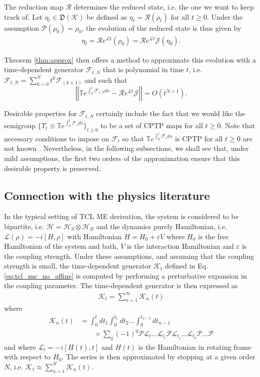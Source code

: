 \documentclass[twocolumn]{autart}    %
\newcommand{\Fc}{\mathcal{F}}
\newcommand{\Hc}{\mathcal{H}}
\newcommand{\Jc}{\mathcal{J}}
\newcommand{\Kc}{\mathcal{K}}
\newcommand{\Lc}{\mathcal{L}}
\newcommand{\Pc}{\mathcal{P}}
\newcommand{\Rc}{\mathcal{R}}
\newcommand{\Tb}{\mathbb{T}}
\newcommand{\Df}{\mathfrak{D}}
\newcommand{\norm}[1]{\left|\left| #1 \right|\right|}
\begin{document}
The reduction map $\Rc$ determines the reduced state, i.e. the one we want to keep track of. Let $\eta_t\in\Df(\Kc)$ be defined as $\eta_t = \Rc(\rho_t)$ for all $t\geq0$. Under the assumption $\Pc(\rho_0)=\rho_0$,
the evolution of the reduced state is thus given by 
\begin{align*}
    \eta_t = \Rc e^{\Lc t} (\rho_0) = \Rc e^{\Lc t}\Jc (\eta_0).
\end{align*}

Theorem \ref{thm:approx} then offers a method to approximate this evolution with a time-dependent generator $\Fc_{t,N}$ that is polynomial in time $t$, i.e. $\Fc_{t,N} = \sum_{k=0}^N t^k \Fc_{(k+1)}$ and such that   
\[\norm{\Tb e^{\int_0^t \Fc_{s,N} ds} - \Rc e^{\Lc t} \Jc} = O(t^{N+1}).\]

Desirable properties for $\Fc_{t,N}$ certainly include the fact that we would like the semigroup $\{\Upsilon_t \equiv \Tb e^{\int_0^t \Fc_s ds} \}_{t\geq0}$ to be a set of CPTP maps for all $t\geq0$. Note that necessary conditions to impose on $\Fc_t$ so that $\Tb e^{\int_0^t \Fc_s ds}$ is CPTP for all $t\geq0$ are not known \cite{benatti2024quantum}. Nevertheless, in the following subsections, we shall see that, under mild assumptions, the first two orders of the approximation ensure that this desirable property is preserved.

\subsection{Connection with the physics literature}
\label{sec:connection_with_literature}

In the typical setting of TCL ME derivation, the system is considered to be bipartite, i.e. $\Hc=\Hc_S\otimes\Hc_B$ and the dynamics purely Hamiltonian, i.e. $\Lc(\rho)=-i[H,\rho]$ with Hamiltonian $H = H_0 + \varepsilon V$ where $H_0$ is the free Hamiltonian of the system and bath, $V$ is the interaction Hamiltonian and $\varepsilon$ is the coupling strength.
Under these assumptions, and assuming that the coupling strength is small, the time-dependent generator $\Kc_t$ defined in Eq. \eqref{eq:tcl_me_no_affine} is computed by performing a perturbative expansion in the coupling parameter. The time-dependent generator is then expressed as 
\begin{align*}
    \Kc_t = \sum_{n=1}^\infty \Kc_n(t)
\end{align*}
where
\begin{align*}
    \Kc_n(t) &= \int_{0}^t dt_1 \int_0^{t_1} dt_2 \dots \int_0^{t_{n-2}}dt_{n-1}\\
    &\qquad \times \sum_q (-1)^q \Pc \Lc_{t} \dots \Lc_{t_i}\Pc\Lc_{t_j}\dots\Lc_{t_k}\Pc\dots\Pc
\end{align*}
and where $\Lc_t = -i[H(t),t]$ and $H(t)$ is the Hamiltonian in rotating frame with respect to $H_0$. The series is then approximated by stopping at a given order $N$, i.e. $\Kc_t\approx\sum_{n=1}^N\Kc_n(t)$.
\end{document}
